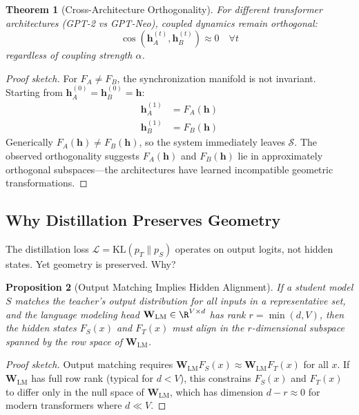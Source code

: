 \documentclass[10pt]{article} %
\theoremstyle{plain}
\newtheorem{theorem}{Theorem}[section]
\newtheorem{proposition}[theorem]{Proposition}
\theoremstyle{definition}
\theoremstyle{remark}
\newcommand{\cS}{\mathcal{S}}
\renewcommand{\vect}[1]{\bm{#1}}
\newcommand{\mat}[1]{\mathbf{#1}}
\begin{document}
\begin{theorem}[Cross-Architecture Orthogonality]
For different transformer architectures (GPT-2 vs GPT-Neo), coupled dynamics remain orthogonal:
\begin{equation}
    \cos(\vect{h}_A^{(t)}, \vect{h}_B^{(t)}) \approx 0 \quad \forall t
\end{equation}
regardless of coupling strength $\alpha$.
\end{theorem}

\begin{proof}[Proof sketch]
For $F_A \neq F_B$, the synchronization manifold is not invariant. Starting from $\vect{h}_A^{(0)} = \vect{h}_B^{(0)} = \vect{h}$:
\begin{align}
    \vect{h}_A^{(1)} &= F_A(\vect{h}) \\
    \vect{h}_B^{(1)} &= F_B(\vect{h})
\end{align}
Generically $F_A(\vect{h}) \neq F_B(\vect{h})$, so the system immediately leaves $\cS$. The observed orthogonality suggests $F_A(\vect{h})$ and $F_B(\vect{h})$ lie in approximately orthogonal subspaces---the architectures have learned incompatible geometric transformations.
\end{proof}

\subsection{Why Distillation Preserves Geometry}

The distillation loss $\mathcal{L} = \text{KL}(p_T \| p_S)$ operates on output logits, not hidden states. Yet geometry is preserved. Why?

\begin{proposition}[Output Matching Implies Hidden Alignment]
If a student model $S$ matches the teacher's output distribution for all inputs in a representative set, and the language modeling head $\mat{W}_{\text{LM}} \in \R^{V \times d}$ has rank $r = \min(d, V)$, then the hidden states $F_S(x)$ and $F_T(x)$ must align in the $r$-dimensional subspace spanned by the row space of $\mat{W}_{\text{LM}}$.
\end{proposition}

\begin{proof}[Proof sketch]
Output matching requires $\mat{W}_{\text{LM}} F_S(x) \approx \mat{W}_{\text{LM}} F_T(x)$ for all $x$. If $\mat{W}_{\text{LM}}$ has full row rank (typical for $d < V$), this constrains $F_S(x)$ and $F_T(x)$ to differ only in the null space of $\mat{W}_{\text{LM}}$, which has dimension $d - r \approx 0$ for modern transformers where $d \ll V$.
\end{proof}
\end{document}
